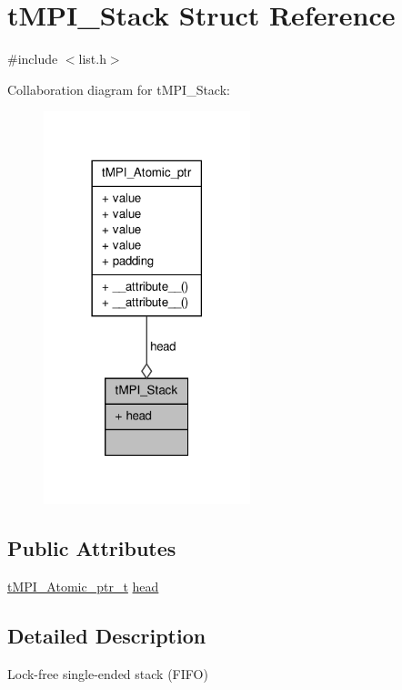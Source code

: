 \hypertarget{structtMPI__Stack}{\section{t\-M\-P\-I\-\_\-\-Stack \-Struct \-Reference}
\label{structtMPI__Stack}
}


{\ttfamily \#include $<$list.\-h$>$}



\-Collaboration diagram for t\-M\-P\-I\-\_\-\-Stack\-:
\nopagebreak
\begin{figure}[H]
\begin{center}
\leavevmode
\includegraphics[width=170pt]{structtMPI__Stack__coll__graph}
\end{center}
\end{figure}
\subsection*{\-Public \-Attributes}
\begin{DoxyCompactItemize}
\item 
\hyperlink{include_2thread__mpi_2atomic_2gcc_8h_a4c91c0105f1c0a5f23bc4239274291eb}{t\-M\-P\-I\-\_\-\-Atomic\-\_\-ptr\-\_\-t} \hyperlink{structtMPI__Stack_a52e3462e96943008d246882671daab83}{head}
\end{DoxyCompactItemize}


\subsection{\-Detailed \-Description}
\-Lock-\/free single-\/ended stack (\-F\-I\-F\-O)

